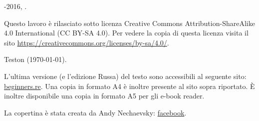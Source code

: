 ﻿\begin{titlepage}


\end{titlepage}

\newpage

\begin{center}
\vspace*{\fill}
{\LARGE \TITLE}

\vspace*{\fill}

{\large \AUTHOR}

{\large \TT{<\EMAIL>}}
\vspace*{\fill}
\vfill

\ccbysa

-2016, \AUTHOR. 

Questo lavoro è rilasciato sotto licenza Creative Commons Attribution-ShareAlike 4.0 International (CC BY-SA 4.0).
Per vedere la copia di questa licenza visita il sito \url{https://creativecommons.org/licenses/by-sa/4.0/}.

Teston ({\large \today}).

L'ultima versione (e l'edizione Russa) del testo sono accessibili al seguente sito: \href{http://go.yurichev.com/17009}{beginners.re}.
\ifdefined\ebook
Una copia in formato A4 è inoltre presente al sito sopra riportato.
\else
È inoltre disponibile una copia in formato A5 per gli e-book reader.
\fi

La copertina è stata creata da Andy Nechaevsky: \href{http://go.yurichev.com/17023}{facebook}.

\end{center}
